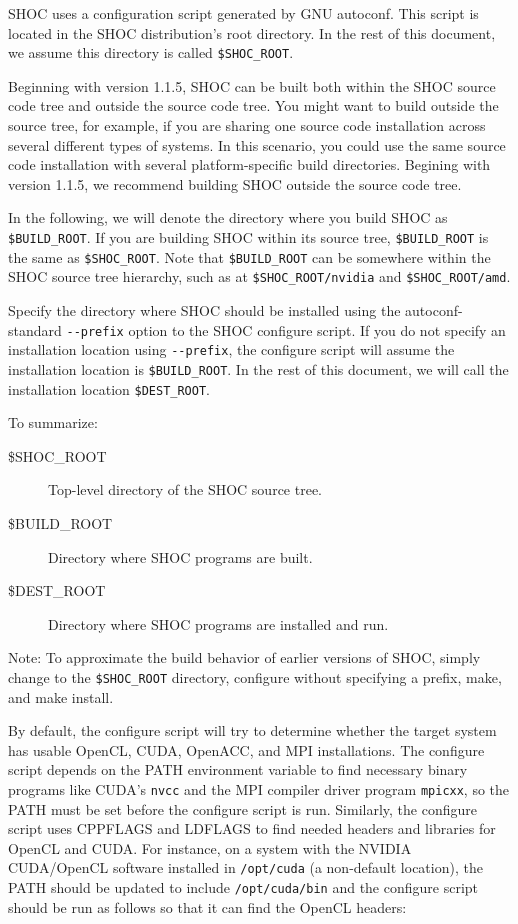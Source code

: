 \documentclass[11pt]{article}
\begin{document}
SHOC uses a configuration script generated by GNU autoconf.  
This script is located in the SHOC distribution's root directory.
In the rest of this document, we assume this directory is called 
\verb+$SHOC_ROOT+.

Beginning with version 1.1.5, SHOC can be built both within the SHOC source 
code tree and outside the source code tree.
You might want to build outside the source tree, for example, if you are 
sharing one source code installation across several different types of systems.
In this scenario, you could use the same source code installation with 
several platform-specific build directories.
Begining with version 1.1.5, we recommend building SHOC outside the source
code tree.

In the following, we will denote the directory where you build SHOC 
as \verb+$BUILD_ROOT+.
If you are building SHOC within its source tree, \verb+$BUILD_ROOT+ is
the same as \verb+$SHOC_ROOT+.
Note that \verb+$BUILD_ROOT+ can be somewhere within the SHOC source tree
hierarchy, such as at \verb+$SHOC_ROOT/nvidia+ and \verb+$SHOC_ROOT/amd+.

Specify the directory where SHOC should be installed using the 
autoconf-standard \verb+--prefix+ option to the SHOC configure script.
If you do not specify an installation location using \verb+--prefix+, the
configure script will assume the installation location is \verb+$BUILD_ROOT+.
In the rest of this document, we will call the installation location
\verb+$DEST_ROOT+.

To summarize:
\begin{description}
\item [\$SHOC\_ROOT] Top-level directory of the SHOC source tree.
\item [\$BUILD\_ROOT] Directory where SHOC programs are built.
\item [\$DEST\_ROOT] Directory where SHOC programs are installed and run.
\end{description}

\begin{framed}
Note: To approximate the build behavior of earlier versions of SHOC,
simply change to the \verb+$SHOC_ROOT+ directory, configure without specifying a
prefix, make, and make install.
\end{framed}

By default, the configure script will try to determine whether the 
target system has usable OpenCL, CUDA, OpenACC, and MPI installations.  
The configure script depends on the PATH environment variable to find necessary
binary programs like CUDA's \verb+nvcc+ and the MPI compiler driver
program \verb+mpicxx+, so the PATH must be set before the configure script is
run.
Similarly, the configure script uses CPPFLAGS and LDFLAGS to find needed
headers and libraries for OpenCL and CUDA.
For instance, on a system with the NVIDIA CUDA/OpenCL software installed
in \verb+/opt/cuda+ (a non-default location), the PATH should be updated to include
\verb+/opt/cuda/bin+ and the configure script should be run as follows so that it can
find the OpenCL headers:
\end{document}

